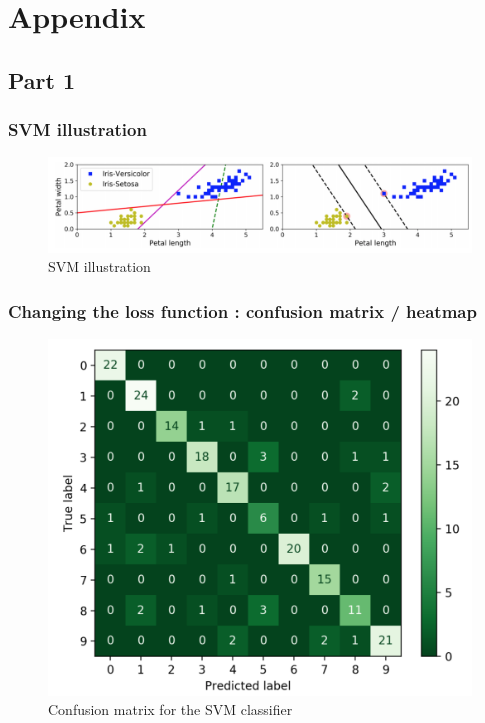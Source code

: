 \section{Appendix}



\subsection{Part 1}
\subsubsection{SVM illustration}
\label{appendix:part1svm}
\begin{figure}[ht]
	\centering 
	\includegraphics[scale = 0.3]{Pics/SVM}
	\caption{SVM illustration}
	\label{fig:svmex}
\end{figure}



\subsubsection{Changing the loss function : confusion matrix / heatmap}
\label{appendix:changingloss}
\begin{figure}[h]
	\centering 
	\includegraphics[scale=0.4]{Pics/confusion_matrixr}
	\caption{Confusion matrix for the SVM classifier}
	\label{fig:confusion}
\end{figure}

